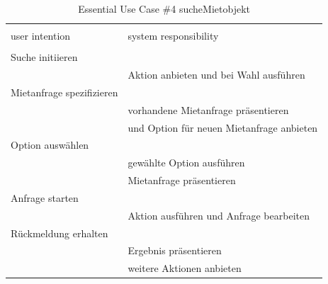 \begin{table}[H]
\caption{Essential Use Case \#4 sucheMietobjekt }
\centering
\begin{tabular}{l l}
\\ [-0.5ex]

\hline\hline
\\ [-0.5ex]
user intention & system responsibility
\\ [1.5ex]
\hline
\\ [-0.5ex]
Suche initiieren        &                                 \\[1ex]
                     & Aktion anbieten und bei Wahl ausführen   \\[1ex]
Mietanfrage spezifizieren  &                                 \\[1ex]
                     & vorhandene Mietanfrage präsentieren      \\[1ex]
                     & und Option für neuen Mietanfrage anbieten  \\[1ex]
Option auswählen           &                                 \\[1ex] 
                     & gewählte Option ausführen                \\[1ex]
                     & Mietanfrage präsentieren                 \\[1ex]
Anfrage starten         &                                 \\[1ex] 
                     & Aktion ausführen und Anfrage bearbeiten  \\[1ex]
Rückmeldung erhalten    &                                 \\[1ex]
                     & Ergebnis präsentieren                 \\[1ex]
                     & weitere Aktionen anbieten                \\[1ex]


\hline
\end{tabular}
\label{tab:mietobjekt}
\end{table}

